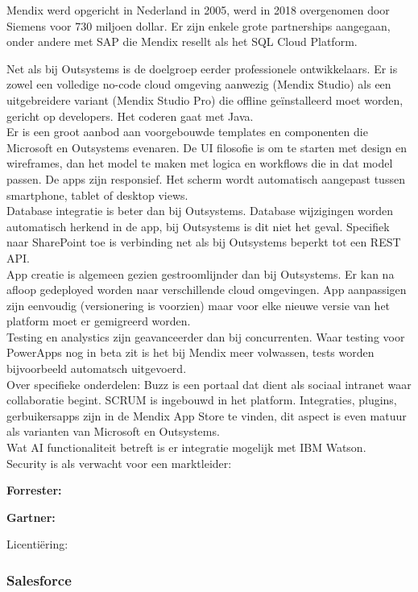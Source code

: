 Mendix werd opgericht in Nederland in 2005, werd in 2018 overgenomen door Siemens voor 730 miljoen dollar. Er zijn enkele grote partnerships aangegaan, onder andere met SAP die Mendix resellt als het SQL Cloud Platform.

Net als bij Outsystems is de doelgroep eerder professionele ontwikkelaars. Er is zowel een volledige no-code cloud omgeving aanwezig (Mendix Studio) als een uitgebreidere variant (Mendix Studio Pro) die offline geïnstalleerd moet worden, gericht op developers. Het coderen gaat met Java.\\
Er is een groot aanbod aan voorgebouwde templates en componenten die Microsoft en Outsystems evenaren.
De UI filosofie is om te starten met design en wireframes, dan het model te maken met logica en workflows die in dat model passen. De apps zijn responsief. Het scherm wordt automatisch aangepast tussen smartphone, tablet of desktop views.\\
Database integratie is beter dan bij Outsystems. Database wijzigingen worden automatisch herkend in de app, bij Outsystems is dit niet het geval. Specifiek naar SharePoint toe is verbinding net als bij Outsystems beperkt tot een REST API.\\
App creatie is algemeen gezien gestroomlijnder dan bij Outsystems. Er kan na afloop gedeployed worden naar verschillende cloud omgevingen. %
App aanpassigen zijn eenvoudig (versionering is voorzien) maar voor elke nieuwe versie van het platform moet er gemigreerd worden.\\
Testing en analystics zijn geavanceerder dan bij concurrenten. Waar testing voor PowerApps nog in beta zit is het bij Mendix meer volwassen, tests worden bijvoorbeeld automatsch uitgevoerd.\\
Over specifieke onderdelen: Buzz is een portaal dat dient als sociaal intranet waar collaboratie begint. SCRUM is ingebouwd in het platform. Integraties, plugins, gerbuikersapps zijn in de Mendix App Store te vinden, dit aspect is even matuur als varianten van Microsoft en Outsystems.\\
Wat AI functionaliteit betreft is er integratie mogelijk met IBM Watson.\\
Security is als verwacht voor een marktleider: %


\textbf{Forrester:} 

\textbf{Gartner:} 

Licentiëring:  

\subsubsection{Salesforce}

